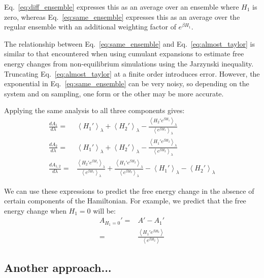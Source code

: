 \documentclass{article}
\begin{document}
Eq.~\ref{eq:diff_ensemble} expresses this as an average over an ensemble where $H_1$ is zero, whereas Eq.~\ref{eq:same_ensemble} expresses this as an average over the regular ensemble with an additional weighting factor of $e^{\beta H_1}$.

The relationship between Eq.~\ref{eq:same_ensemble} and Eq.~\ref{eq:almost_taylor} is similar to that encountered when using cumulant expansions to estimate free energy changes from non-equilibrium simulations using the Jarzynski inequality. Truncating Eq.~\ref{eq:almost_taylor} at a finite order introduces error. However, the exponential in Eq.~\ref{eq:same_ensemble} can be very noisy, so depending on the system and on sampling, one form or the other may be more accurate.

Applying the same analysis to all three components gives:
\begin{align*}
\frac{dA_1}{d\lambda} =&
	\left\langle
		H_1'
	\right\rangle_\lambda +
	\left\langle
		H_2'
	\right\rangle_\lambda -
	\frac
		{\left\langle H_2' e^{\beta H_1} \right\rangle_\lambda}
		{\left\langle e^{\beta H_1} \right\rangle_\lambda} \\
\frac{dA_2}{d\lambda} =&
	\left\langle
		H_1'
	\right\rangle_\lambda +
	\left\langle
		H_2'
	\right\rangle_\lambda -
	\frac
		{\left\langle H_1' e^{\beta H_2} \right\rangle_\lambda}
		{\left\langle e^{\beta H_2} \right\rangle_\lambda} \\
\frac{dA_{1,2}}{d\lambda} =&
	\frac
		{\left\langle H_2' e^{\beta H_1} \right\rangle_\lambda}
		{\left\langle e^{\beta H_1} \right\rangle_\lambda} +
	\frac
		{\left\langle H_1' e^{\beta H_2} \right\rangle_\lambda}
		{\left\langle e^{\beta H_2} \right\rangle_\lambda} -
	\left\langle
		H_1'
	\right\rangle_\lambda -
	\left\langle
		H_2'
	\right\rangle_\lambda
\end{align*}

We can use these expressions to predict the free energy change in the absence of certain components of the Hamiltonian. For example, we predict that the free energy change when $H_1=0$ will be:
\begin{align*}
A_{H_1=0}' =& A' - A_1'\\
=&
\frac
	{\left\langle H_1' e^{\beta H_2} \right\rangle}
	{\left\langle e^{\beta H_2} \right\rangle}
\end{align*}

\subsection{Another approach...}
\end{document}
